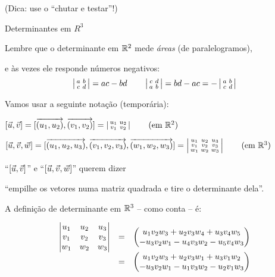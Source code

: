\documentclass[oneside]{book}
\begin{document}
(Dica: use o ``chutar e testar''!)



\newpage


%                     

 {Determinantes em $R^3$}

\ssk

Lembre que o determinante em $\mathbb{R}^2$ mede {\sl áreas} (de paralelogramos),

e às vezes ele responde números negativos:
%
$$\left |\begin{smallmatrix}a&b\\c&d\\\end{smallmatrix}\right |
  = ac-bd \qquad
  \left |\begin{smallmatrix}c&d\\a&b\\\end{smallmatrix}\right | = bd-ac = -\left |\begin{smallmatrix}a&b\\c&d\\\end{smallmatrix}\right |
$$

Vamos usar a seguinte notação (temporária):

$[\uu,\vv]
  = [\V(u_1, u_2), \V(v_1, v_2)]
  = \vsm{u_1 & u_2 \\ v_1 & v_2 \\}
  \qquad \text{(em $\R^2$)}
$

$[\uu,\vv,\ww]
  = [\V(u_1, u_2, u_3), \V(v_1, v_2, v_3), \V(w_1, w_2, w_3)]
  = \vsm{u_1 & u_2 & u_3 \\ v_1 & v_2 & v_3 \\ w_1 & w_2 & w_3 \\}
  \qquad \text{(em $\R^3$)}
$

``$[{\vec u},{\vec v}]$'' e ``$[{\vec u},{\vec v},{\vec w}]$'' querem dizer

``empilhe os vetores numa matriz quadrada e tire o determinante dela''.

\msk

A definição de determinante em $\mathbb{R}^3$ -- como conta -- é:

$$\begin{array}{rcl}
  \left |\begin{matrix}u_1 & u_2 & u_3 \\ v_1 & v_2 & v_3 \\ w_1 & w_2 & w_3 \\\end{matrix}\right |
  &=& \left (\begin{matrix}u_1v_2w_3 + u_2v_3w_4 + u_3v_4w_5 \\
         -u_3v_2w_1 - u_4v_3w_2 - u_5v_4w_3 \\
        \end{matrix}\right ) \\
  &=& \left (\begin{matrix}u_1v_2w_3 + u_2v_3w_1 + u_3v_1w_2 \\
         -u_3v_2w_1 - u_1v_3w_2 - u_2v_1w_3 \\
        \end{matrix}\right )
  \end{array}
$$
\end{document}
